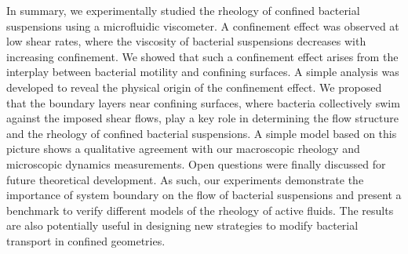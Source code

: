 In summary, we experimentally studied the rheology of confined bacterial suspensions using a microfluidic viscometer. A confinement effect was observed at low shear rates, where the viscosity of bacterial suspensions decreases with increasing confinement. We showed that such a confinement effect arises from the interplay between bacterial motility and confining surfaces. A simple analysis was developed to reveal the physical origin of the confinement effect. We proposed that the boundary layers near confining surfaces, where bacteria collectively swim against the imposed shear flows, play a key role in determining the flow structure and the rheology of confined bacterial suspensions. A simple model based on this picture shows a qualitative agreement with our macroscopic rheology
and microscopic dynamics measurements. Open questions were finally discussed for future theoretical development. As such, our experiments demonstrate the importance of system boundary on the flow of bacterial suspensions and present a benchmark to verify different models of the rheology of active fluids. The results are also potentially useful in designing new strategies to modify bacterial transport in confined geometries.
